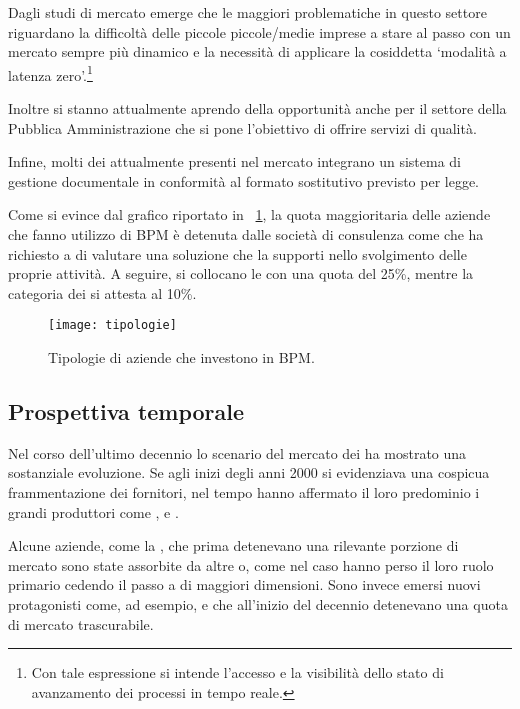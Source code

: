 Dagli studi di mercato emerge che le maggiori problematiche in questo settore riguardano la difficoltà delle piccole piccole/medie imprese a stare al passo con un mercato sempre più dinamico e la necessità di applicare la cosiddetta `modalità a latenza zero'.\footnote{Con tale espressione si intende l'accesso e la visibilità dello stato di avanzamento dei processi in tempo reale.}

Inoltre si stanno attualmente aprendo della opportunità anche per il settore della Pubblica Amministrazione che si pone l'obiettivo di offrire servizi di qualità.

Infine, molti dei \sw attualmente presenti nel mercato integrano un sistema di gestione documentale in conformità al formato sostitutivo previsto per legge.

Come si evince dal grafico riportato in \figurename~\ref{fig:tipologie}, la quota maggioritaria delle aziende che fanno utilizzo di \sw BPM è detenuta dalle società di consulenza come \customer che ha richiesto a \team di valutare una soluzione che la supporti nello svolgimento delle proprie attività. A seguire, si collocano le \sw {} con una quota del 25\%, mentre la categoria dei  si attesta al 10\%.

\begin{figure}[H]
  \centering
  \texttt{[image: tipologie]}
  \caption{Tipologie di aziende che investono in \sw BPM.}
  \label{fig:tipologie}
\end{figure}

\subsection{Prospettiva temporale}
Nel corso dell'ultimo decennio lo scenario del mercato dei \sw ha mostrato una sostanziale evoluzione. Se agli inizi degli anni 2000 si evidenziava una cospicua frammentazione dei fornitori, nel tempo hanno affermato il loro predominio i grandi produttori come , e .

Alcune aziende, come la , che prima detenevano una rilevante porzione di mercato sono state assorbite da altre o, come nel caso  hanno perso il loro ruolo primario cedendo il passo a  di maggiori dimensioni. Sono invece emersi nuovi protagonisti come, ad esempio,  e  che all'inizio del decennio detenevano una quota di mercato trascurabile.


